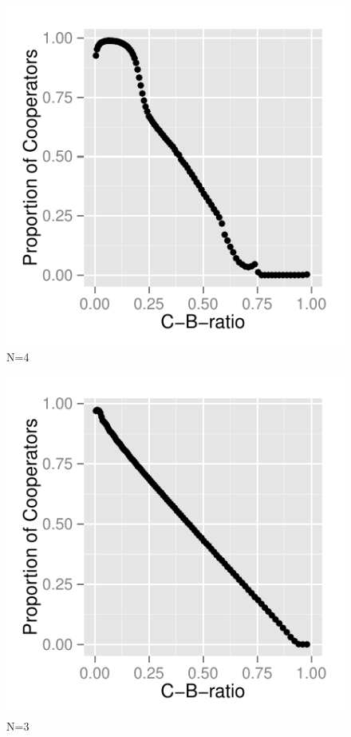 \documentclass[DIV=calc, paper=a4, fontsize=11pt, twocolumn]{scrartcl}	 %
\begin{document}
\begin{figure}[here]
\centering
\begin{minipage}{.35\textwidth}
  \centering
  \includegraphics[width=1\linewidth]{HDN4}
 \caption{N=4}
\label{fig:HDn1}
\end{minipage}%
\end{figure}

\begin{figure}[here]
\centering
\begin{minipage}{.35\textwidth}
  \centering
  \includegraphics[width=1\linewidth]{HDN3}
 \caption{N=3}
\label{fig:HDm3}
\end{minipage}%
\end{figure}
\end{document}
